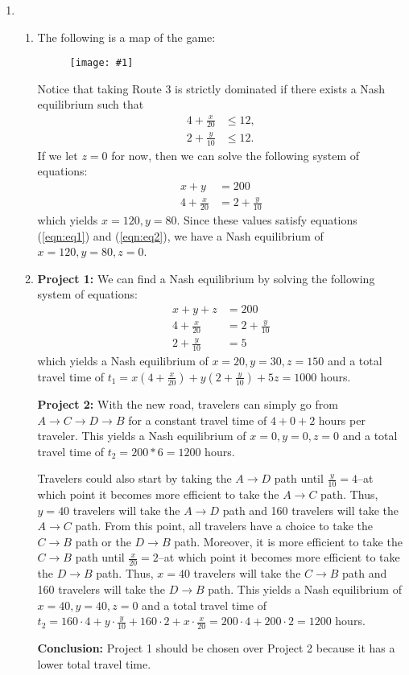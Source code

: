 \documentclass{article}
\newcommand{\image}[1]{\begin{figure}[H]
            \texttt{[image: \#1]}
            \centering
        \end{figure}}
\begin{document}
\begin{enumerate}
    \pagebreak

    \item
    \begin{enumerate}
        \item The following is a map of the game:
        \image{assets/q4a.png}

        Notice that taking Route 3 is strictly dominated if there exists a Nash equilibrium such that 
        \begin{align}
            4+\frac{x}{20} & \leq12, \label{eqn:eq1} \\ 
            2+\frac{y}{10} & \leq12. \label{eqn:eq2}
        \end{align} 
        If we let $z=0$ for now, then we can solve the following system of equations:
        \begin{align*}
            x+y & =200 \\    
            4+\frac{x}{20} & = 2+\frac{y}{10}
        \end{align*}
        which yields $x=120,y=80$. Since these values satisfy equations (\ref{eqn:eq1}) and (\ref{eqn:eq2}), we have a Nash equilibrium of $x=120,y=80,z=0$.

        \item
        \textbf{Project 1:} We can find a Nash equilibrium by solving the following system of equations:
        \begin{align*}
            x+y+z & =200 \\
            4+\frac{x}{20} & =2+\frac{y}{10} \\
            2+\frac{y}{10} & =5 
        \end{align*}
        which yields a Nash equilibrium of $x=20,y=30,z=150$ and a total travel time of $t_1=x\left(4+\frac{x}{20}\right) + y\left(2+\frac{y}{10}\right) + 5z =1000$ hours.

        \textbf{Project 2:} With the new road, travelers can simply go from $A\to C\to D\to B$ for a constant travel time of $4+0+2$ hours per traveler. This yields a Nash equilibrium of $x=0,y=0,z=0$ and a total travel time of $t_2=200*6=1200$ hours.

        Travelers could also start by taking the $A\to D$ path until $\frac{y}{10}=4$--at which point it becomes more efficient to take the $A\to C$ path. Thus, $y=40$ travelers will take the $A\to D$ path and 160 travelers will take the $A\to C$ path. From this point, all travelers have a choice to take the $C\to B$ path or the $D\to B$ path. Moreover, it is more efficient to take the $C\to B$ path until $\frac{x}{20}=2$--at which point it becomes more efficient to take the $D\to B$ path. Thus, $x=40$ travelers will take the $C\to B$ path and 160 travelers will take the $D\to B$ path. This yields a Nash equilibrium of $x=40,y=40,z=0$ and a total travel time of $t_2=160\cdot4+y\cdot\frac{y}{10}+160\cdot2+x\cdot\frac{x}{20}=200\cdot4+200\cdot2=1200$ hours.

        \textbf{Conclusion:} Project 1 should be chosen over Project 2 because it has a lower total travel time.
    \end{enumerate}

\end{enumerate}
\end{document}
